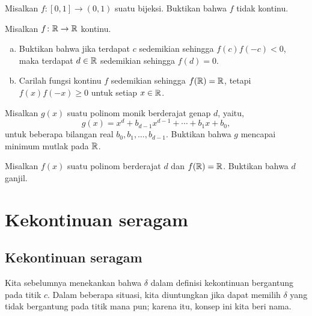 \begin{exercise}
Misalkan $f \colon [0,1] \to (0,1)$ suatu bijeksi.  Buktikan bahwa $f$ tidak
kontinu.
\end{exercise}

\begin{exercise}
Misalkan $f \colon {\mathbb{R}} \to {\mathbb{R}}$ kontinu.
\begin{enumerate}[a)]
\item
Buktikan bahwa jika terdapat $c$ sedemikian sehingga $f(c)f(-c) < 0$,
maka terdapat $d \in {\mathbb{R}}$ sedemikian sehingga $f(d) = 0$.
\item
Carilah fungsi kontinu $f$ sedemikian sehingga
$f({\mathbb{R}}) = {\mathbb{R}}$, tetapi $f(x)f(-x) \geq 0$ untuk setiap $x \in {\mathbb{R}}$.
\end{enumerate}
\end{exercise}

\begin{exercise}
Misalkan $g(x)$ suatu polinom monik berderajat genap $d$, yaitu,
\begin{equation*}
g(x) = x^d + b_{d-1} x^{d-1} + \cdots + b_1 x + b_0 ,
\end{equation*}
untuk beberapa bilangan real $b_{0}, b_1, \ldots, b_{d-1}$.
Buktikan bahwa $g$ mencapai minimum mutlak pada ${\mathbb{R}}$.
\end{exercise}

\begin{exercise}
Misalkan $f(x)$ suatu polinom berderajat $d$ dan
$f({\mathbb{R}}) = {\mathbb{R}}$.  Buktikan bahwa $d$ ganjil.
\end{exercise}


\sectionnewpage
\section{Kekontinuan seragam}
\label{sec:unifcont}



\subsection{Kekontinuan seragam}

Kita sebelumnya menekankan bahwa $\delta$ dalam definisi kekontinuan
bergantung pada titik $c$.  Dalam beberapa situasi, kita diuntungkan jika dapat
memilih $\delta$ yang tidak bergantung pada titik mana pun; karena itu, konsep
ini kita beri nama.


